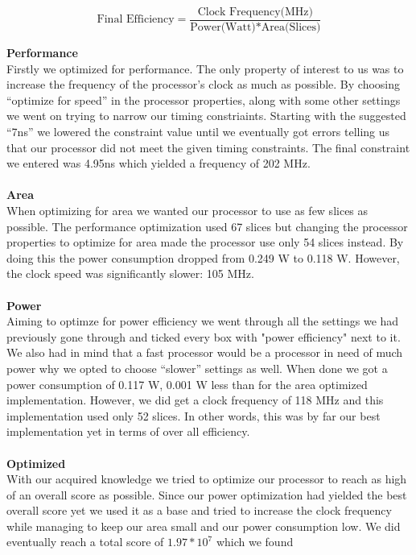 \documentclass[a4paper,11pt]{article}
\begin{document}
$$ \text{Final Efficiency} = 
\frac{\text{Clock Frequency(MHz)}}{\text{Power(Watt)*Area(Slices)}}$$

\noindent
{\bf Performance}\\
\noindent
Firstly we optimized for performance. The only property of interest to us was 
to increase the frequency of the processor's clock as much as possible. By 
choosing ``optimize for speed'' in the processor properties, along with some 
other settings we went on trying to narrow our timing constriaints. Starting 
with the suggested ``7ns'' we lowered the constraint value until we eventually 
got errors telling us that our processor did not meet the given timing 
constraints. The final constraint we entered was 4.95ns which yielded a 
frequency of 202 MHz.\\\\
\noindent
{\bf Area}\\
\noindent
When optimizing for area we wanted our processor to use as few slices as 
possible. The performance optimization used 67 slices but changing the 
processor properties to optimize for area made the processor use only 54 
slices instead. By doing this the power consumption dropped from 0.249 W to 
0.118 W. However, the clock speed was significantly slower: 105 MHz.\\\\
\noindent
{\bf Power}\\
\noindent
Aiming to optimze for power efficiency we went through all the settings we 
had previously gone through and ticked every box with "power efficiency" next 
to it. We also had in mind that a fast processor would be a processor in need 
of much power why we opted to choose ``slower'' settings as well. When done 
we got a power consumption of 0.117 W, 0.001 W less than for the area 
optimized implementation. However, we did get a clock frequency of 118 MHz 
and this implementation used only 52 slices. In other words, this was by far 
our best implementation yet in terms of over all efficiency.\\\\
\noindent
{\bf Optimized}\\
\noindent
With our acquired knowledge we tried to optimize our processor to reach as 
high of an overall score as possible. Since our power optimization had yielded 
the best overall score yet we used it as a base and tried to increase the 
clock frequency while managing to keep our area small and our power consumption 
low. We did eventually reach a total score of $1.97*10^7$ which we found 
\end{document}
